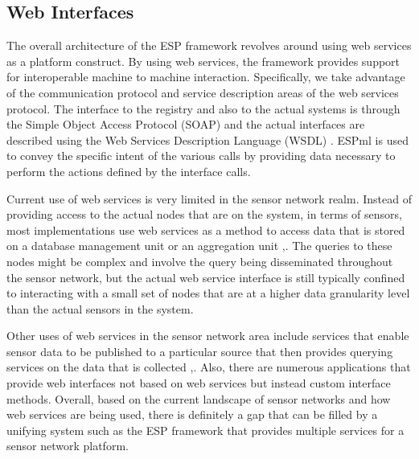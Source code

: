 \subsection{Web Interfaces}
The overall architecture of the ESP framework revolves around using web services as
a platform construct.  By using web services, the framework provides support
for interoperable machine to machine interaction.  Specifically, we take advantage of
the communication protocol and service description areas of the web services protocol.
The interface to the registry and also to the actual systems is through the Simple Object
Access Protocol (SOAP) and the actual interfaces are described using the Web Services
Description Language (WSDL) \cite{curbera2002uws}.  ESPml is used to convey the specific
intent of the various calls by providing data necessary to perform the actions 
defined by the interface calls.

Current use of web services is very limited in the sensor network realm.  Instead of providing
access to the actual nodes that are on the system, in terms of sensors, most implementations use
web services as a method to access data that is stored on a database management unit or an aggregation
unit \cite{buonadonna2005tsn},\cite{codeblue}.  The queries to these nodes might be complex and involve 
the query being disseminated throughout the sensor network, but the actual web service interface is still 
typically confined to interacting with a small set of nodes that are at a higher data granularity 
level than the actual sensors in the system. 

Other uses of web services in the sensor network area include 
services that enable sensor data to be published to a particular source that then provides querying services 
on the data that is collected \cite{sensorbase},\cite{senseweb}.  Also, there are numerous applications that
provide web interfaces not based on web services but instead custom interface methods.  Overall, based on the
current landscape of sensor networks and how web services are being used, there is definitely a gap that can
be filled by a unifying system such as the ESP framework that provides multiple services for a sensor network
platform.
 
